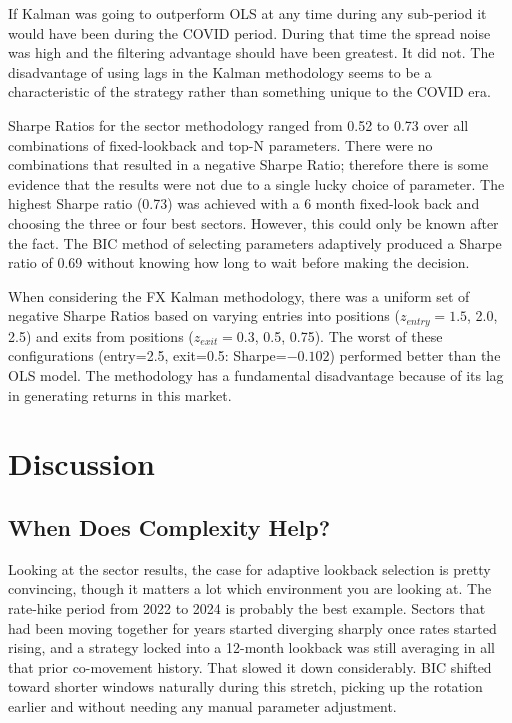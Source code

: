 \documentclass[12pt]{article}
\begin{document}
If Kalman was going to outperform OLS at any time during any sub-period it would have been during the COVID period. During that time the spread noise was high and the filtering advantage should have been greatest. It did not. The disadvantage of using lags in the Kalman methodology seems to be a characteristic of the strategy rather than something unique to the COVID era.

Sharpe Ratios for the sector methodology ranged from 0.52 to 0.73 over all combinations of fixed-lookback and top-N parameters. There were no combinations that resulted in a negative Sharpe Ratio; therefore there is some evidence that the results were not due to a single lucky choice of parameter. The highest Sharpe ratio (0.73) was achieved with a 6 month fixed-look back and choosing the three or four best sectors. However, this could only be known after the fact. The BIC method of selecting parameters adaptively produced a Sharpe ratio of 0.69 without knowing how long to wait before making the decision.

When considering the FX Kalman methodology, there was a uniform set of negative Sharpe Ratios based on varying entries into positions ($z_{entry} = 1.5$, 2.0, 2.5) and exits from positions ($z_{exit} = 0.3$, 0.5, 0.75). The worst of these configurations (entry=2.5, exit=0.5: Sharpe=$-0.102$) performed better than the OLS model. The methodology has a fundamental disadvantage because of its lag in generating returns in this market.

\section{Discussion}

\subsection{When Does Complexity Help?}

Looking at the sector results, the case for adaptive lookback selection is pretty convincing, though it matters a lot which environment you are looking at. The rate-hike period from 2022 to 2024 is probably the best example. Sectors that had been moving together for years started diverging sharply once rates started rising, and a strategy locked into a 12-month lookback was still averaging in all that prior co-movement history. That slowed it down considerably. BIC shifted toward shorter windows naturally during this stretch, picking up the rotation earlier and without needing any manual parameter adjustment.
\end{document}
